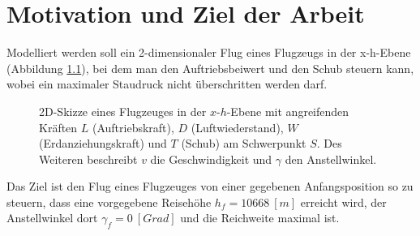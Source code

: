 \chapter{Motivation und Ziel der Arbeit}
Modelliert werden soll ein 2-dimensionaler Flug eines Flugzeugs in der x-h-Ebene (Abbildung \ref{img:Flugzeug}), bei dem man den Auftriebsbeiwert und den Schub steuern kann, wobei ein maximaler Staudruck nicht überschritten werden darf.

\begin{figure}[H]
\begin{center}
\caption{2D-Skizze eines Flugzeuges in der $x$-$h$-Ebene mit angreifenden Kräften $L$ (Auftriebskraft), $D$ (Luftwiederstand), $W$ (Erdanziehungskraft) und $T$ (Schub) am Schwerpunkt $S$. Des Weiteren beschreibt $v$ die Geschwindigkeit und $\gamma$ den Anstellwinkel.}\label{img:Flugzeug}
\end{center}
\end{figure}

Das Ziel ist den Flug eines Flugzeuges von einer gegebenen Anfangsposition so zu steuern, dass eine vorgegebene Reisehöhe $h_f = 10668 \ [m]$ erreicht wird, der Anstellwinkel dort $\gamma_f = 0 \ [Grad]$ und die Reichweite maximal ist.
